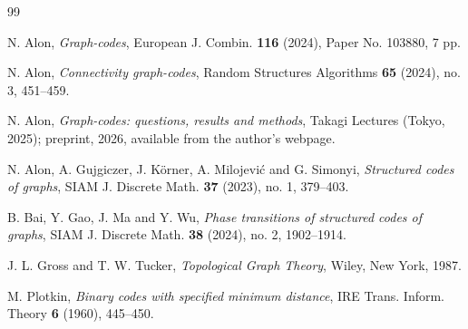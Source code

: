 \documentclass[11pt,reqno]{amsart}
\theoremstyle{plain}
\theoremstyle{definition}
\begin{document}
\begin{thebibliography}{99}

 N. Alon, \emph{Graph-codes}, European J. Combin. \textbf{116} (2024), Paper No. 103880, 7 pp.

 N. Alon, \emph{Connectivity graph-codes}, Random Structures Algorithms \textbf{65} (2024), no. 3, 451--459.

 N. Alon, \emph{Graph-codes: questions, results and methods}, Takagi Lectures (Tokyo, 2025); preprint, 2026, available from the author's webpage.

 N. Alon, A. Gujgiczer, J. Körner, A. Milojević and G. Simonyi, \emph{Structured codes of graphs}, SIAM J. Discrete Math. \textbf{37} (2023), no. 1, 379--403.

 B. Bai, Y. Gao, J. Ma and Y. Wu, \emph{Phase transitions of structured codes of graphs}, SIAM J. Discrete Math. \textbf{38} (2024), no. 2, 1902--1914.

 J. L. Gross and T. W. Tucker, \emph{Topological Graph Theory}, Wiley, New York, 1987.

 M. Plotkin, \emph{Binary codes with specified minimum distance}, IRE Trans. Inform. Theory \textbf{6} (1960), 445--450.

\end{thebibliography}
\end{document}
